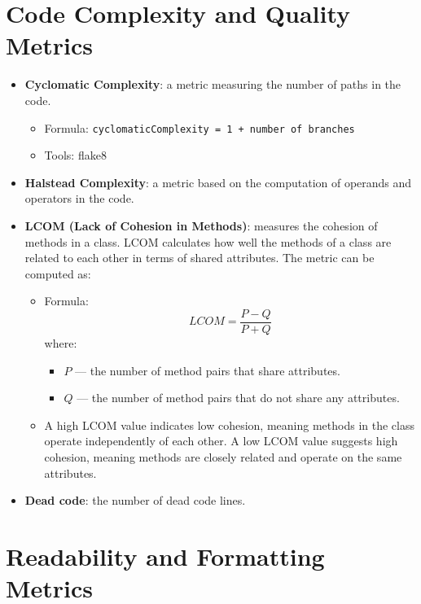 \documentclass{article}
\begin{document}
\section{Code Complexity and Quality Metrics}

\begin{itemize}
    \item \textbf{Cyclomatic Complexity}: a metric measuring the number of paths in the code.
    \begin{itemize}
        \item Formula: \texttt{cyclomaticComplexity = 1 + number of branches}
        \item Tools: flake8
    \end{itemize}
    \item \textbf{Halstead Complexity}: a metric based on the computation of operands and operators in the code.
    \item \textbf{LCOM (Lack of Cohesion in Methods)}: measures the cohesion of methods in a class. LCOM calculates how well the methods of a class are related to each other in terms of shared attributes. The metric can be computed as:
    \begin{itemize}
        \item Formula: 
        \[
        LCOM = \frac{P - Q}{P + Q}
        \]
        where:
        \begin{itemize}
            \item \( P \) — the number of method pairs that share attributes.
            \item \( Q \) — the number of method pairs that do not share any attributes.
        \end{itemize}
        \item A high LCOM value indicates low cohesion, meaning methods in the class operate independently of each other. A low LCOM value suggests high cohesion, meaning methods are closely related and operate on the same attributes.
    \end{itemize}
    \item \textbf{Dead code}: the number of dead code lines.
\end{itemize}

\section{Readability and Formatting Metrics}
\end{document}
